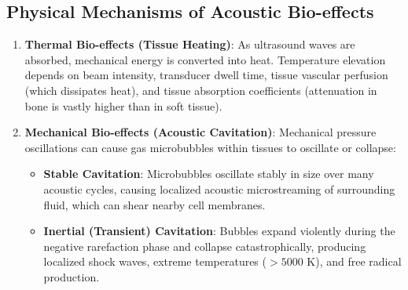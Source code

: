\documentclass[11pt,a4paper]{article}
\begin{document}
\subsection{Physical Mechanisms of Acoustic Bio-effects}
\begin{enumerate}[leftmargin=*]
    \item \textbf{Thermal Bio-effects (Tissue Heating)}: As ultrasound waves are absorbed, mechanical energy is converted into heat. Temperature elevation depends on beam intensity, transducer dwell time, tissue vascular perfusion (which dissipates heat), and tissue absorption coefficients (attenuation in bone is vastly higher than in soft tissue).
    \item \textbf{Mechanical Bio-effects (Acoustic Cavitation)}: Mechanical pressure oscillations can cause gas microbubbles within tissues to oscillate or collapse:
    \begin{itemize}
        \item \textbf{Stable Cavitation}: Microbubbles oscillate stably in size over many acoustic cycles, causing localized acoustic microstreaming of surrounding fluid, which can shear nearby cell membranes.
        \item \textbf{Inertial (Transient) Cavitation}: Bubbles expand violently during the negative rarefaction phase and collapse catastrophically, producing localized shock waves, extreme temperatures ($>5000\text{ K}$), and free radical production.
    \end{itemize}
\end{enumerate}
\end{document}
